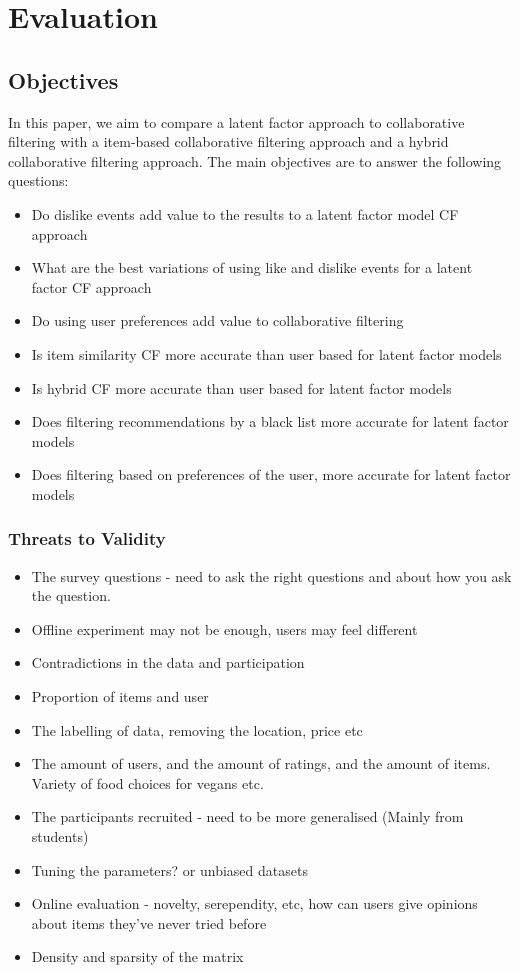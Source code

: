 \chapter{Evaluation}\label{C:evaluation}

\section{Objectives}
In this paper, we aim to compare a latent factor approach to collaborative filtering with a item-based collaborative filtering approach and a hybrid collaborative filtering approach. The main objectives are to answer the following questions:
\begin{itemize}
	\item{Do dislike events add value to the results to a latent factor model CF approach}
	\item{What are the best variations of using like and dislike events for a latent factor CF approach}
	\item{Do using user preferences add value to collaborative filtering}
	\item{Is item similarity CF more accurate than user based for latent factor models}
	\item{Is hybrid CF more accurate than user based for latent factor models}
	\item{Does filtering recommendations by a black list more accurate for latent factor models}
	\item{Does filtering based on preferences of the user, more accurate for latent factor models}
\end{itemize}

\subsection{Threats to Validity}
\begin{itemize}
	\item{The survey questions - need to ask the right questions and about how you ask the question.}
	\item{Offline experiment may not be enough, users may feel different}
	\item{Contradictions in the data and participation}
	\item{Proportion of items and user}
	\item{The labelling of data, removing the location, price etc}
	\item{The amount of users, and the amount of ratings, and the amount of items. Variety of food choices for vegans etc. }
	\item{The participants recruited - need to be more generalised (Mainly from students)}
	\item{Tuning the parameters? or unbiased datasets}
	\item{Online evaluation - novelty, serependity, etc, how can users give opinions about items they've never tried before}
	\item{Density and sparsity of the matrix}
\end{itemize}

